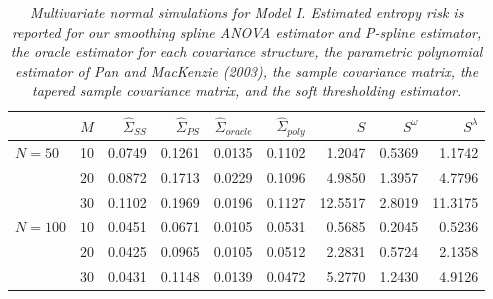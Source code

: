 \bigskip
\setlength{\dashlinedash}{0.5pt}
\setlength{\dashlinegap}{1pt}
\setlength{\arrayrulewidth}{0.2pt}
%
\begin{table}[H]
\centering
\caption{\textit{Multivariate normal simulations for Model I. Estimated entropy risk is reported for our smoothing spline ANOVA estimator and P-spline estimator, the oracle estimator for each covariance structure, the parametric polynomial estimator of Pan and MacKenzie (2003), the sample covariance matrix, the tapered sample covariance matrix, and the soft thresholding estimator.}}
\begin{tabular}{lrrrrrrrr}
 & $M$ &$\hat{\Sigma}_{SS}$& $\hat{\Sigma}_{PS}$ &$\hat{\Sigma}_{oracle}$& $\hat{\Sigma}_{poly}$ & $S$ &$S^\omega$& $S^\lambda$ \\ 
  \hline
$N = 50$ & 10 & 0.0749 & 0.1261 & 0.0135 & 0.1102 & 1.2047 & 0.5369 & 1.1742 \\ 
   & $20$ & 0.0872 & 0.1713 & 0.0229 & 0.1096 & 4.9850 & 1.3957 & 4.7796 \\ 
   & $30$ & 0.1102 & 0.1969 & 0.0196 & 0.1127 & 12.5517 & 2.8019 & 11.3175 \\ 
 $N = 100$ & $10$ & 0.0451 & 0.0671 & 0.0105 & 0.0531 & 0.5685 & 0.2045 & 0.5236 \\ 
   & $20$ & 0.0425 & 0.0965 & 0.0105 & 0.0512 & 2.2831 & 0.5724 & 2.1358 \\ 
   & $30$ & 0.0431 & 0.1148 & 0.0139 & 0.0472 & 5.2770 & 1.2430 & 4.9126 \\ 
   \hline
\end{tabular}
\label{table:simulation-1-entropy-loss-sigma-1}
\end{table}

